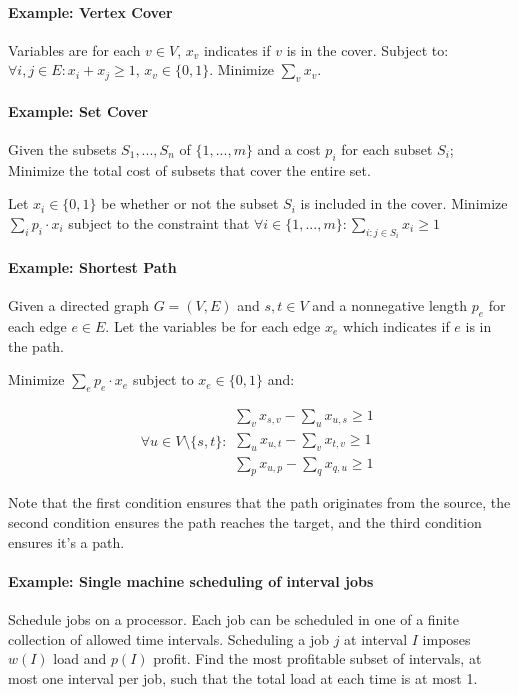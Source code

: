 \documentclass[a4paper]{article}
\begin{document}
\paragraph{Example: Vertex Cover}
Variables are for each $v \in V$, $x_v$ indicates if $v$ is in the cover.
Subject to: $\forall i,j \in E : x_i + x_j \ge 1$, $x_v \in \{0, 1\}$.
Minimize $\sum_v x_v$.

\paragraph{Example: Set Cover}
Given the subsets $S_1,...,S_n$ of $\{1,...,m\}$ and a cost $p_i$ for each subset $S_i$; Minimize the total cost of subsets that cover the entire set.

Let $x_i \in \{0, 1\}$ be whether or not the subset $S_i$ is included in the cover. Minimize $\sum_i p_i \cdot x_i$ subject to the constraint that $\forall i \in \{1,...,m\} : \sum_{i:j \in S_i} x_i \ge 1$

\paragraph{Example: Shortest Path}
Given a directed graph $G=(V,E)$ and $s,t \in V$ and a nonnegative length $p_e$ for each edge $e \in E$.
Let the variables be for each edge $x_e$ which indicates if $e$ is in the path.

Minimize $\sum_e p_e \cdot x_e$ subject to $x_e \in \{0, 1\}$ and:

\[\forall u\in V \setminus \{s,t\} : 
\begin{matrix}
  \sum_v x_{s,v} - \sum_u x_{u,s} \ge 1 \\
  \sum_u x_{u,t} - \sum_v x_{t,v} \ge 1 \\
  \sum_p x_{u,p} - \sum_q x_{q,u} \ge 1
\end{matrix}
\]

Note that the first condition ensures that the path originates from the source, the second condition ensures the path reaches the target, and the third condition ensures it's a path.

\paragraph{Example: Single machine scheduling of interval jobs}
Schedule jobs on a processor.
Each job can be scheduled in one of a finite collection of allowed time intervals.
Scheduling a job $j$ at interval $I$ imposes $w(I)$ load and $p(I)$ profit.
Find the most profitable subset of intervals, at most one interval per job, such that the total load at each time is at most 1.
\end{document}
